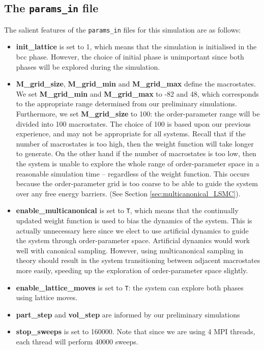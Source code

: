 \documentclass{report}
\begin{document}
\subsection{The \texttt{params\_in} file}
The salient features of the \texttt{params\_in} files for this simulation are as follows:
\begin{itemize}
\item \textbf{init\_lattice} is set to 1, which means that the simulation is initialised in the bcc phase. However, the choice of initial phase is 
  unimportant since both phases will be explored during the simulation.
\item \textbf{M\_grid\_size}, \textbf{M\_grid\_min} and \textbf{M\_grid\_max} define the macrostates. We set \textbf{M\_grid\_min} and \textbf{M\_grid\_max}
  to -82 and 48, which corresponds to the appropriate range determined from our preliminary simulations. 
  Furthermore, we set \textbf{M\_grid\_size} to 100: the order-parameter range will be divided into
  100 macrostates. The choice of 100 is based upon our previous experience, and may not be appropriate for all systems. 
  Recall that if the number of macrostates is too high, then the weight function will take longer to generate. On the other hand if the number of macrostates
  is too low, then the system is unable to explore the whole range of order-parameter space in a reasonable simulation time -- regardless
  of the weight function. This occurs because the order-parameter grid is too coarse to be able to guide the system over any free energy barriers.
  (See Section \ref{sec:multicanonical_LSMC}).
\item \textbf{enable\_multicanonical} is set to \texttt{T}, which means that the continually updated weight function is used to bias the dynamics of the system.
  This is actually unnecessary here since we elect to use artificial dynamics to guide the system through order-parameter space. Artificial dynamics would
  work well with canonical sampling. However, using multicanonical sampling in theory should result in the system transitioning between adjacent macrostates 
  more easily, speeding up the exploration of order-parameter space slightly.
\item \textbf{enable\_lattice\_moves} is set to \texttt{T}: the system can explore both phases using lattice moves.
\item \textbf{part\_step} and \textbf{vol\_step} are informed by our preliminary simulations
\item \textbf{stop\_sweeps} is set to 160000. Note that since we are using 4 MPI threads, each thread will perform 40000 sweeps.

\end{itemize}
\end{document}
